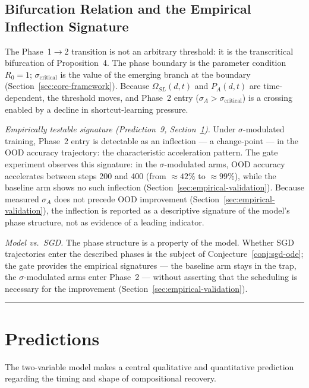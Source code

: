 \documentclass{article}
\theoremstyle{definition}
\begin{document}
\subsection{Bifurcation Relation and the Empirical Inflection Signature}\label{sec:bifurcation}

The Phase~1$\to$2 transition is not an arbitrary threshold: it is the
transcritical bifurcation of Proposition~4. The phase boundary is the
parameter condition $R_0 = 1$; $\sigma_{\text{critical}}$ is the value
of the emerging branch at the boundary (Section~\ref{sec:core-framework}).
Because $\Omega_{SL}(d,t)$ and $P_A(d,t)$ are time-dependent, the
threshold moves, and Phase~2 entry ($\sigma_A > \sigma_{\text{critical}}$)
is a crossing enabled by a decline in shortcut-learning pressure.

\noindent\emph{Empirically testable signature (Prediction~9,
Section~\ref{sec:predictions}).} Under $\sigma$-modulated training,
Phase~2 entry is detectable as an inflection --- a change-point --- in
the OOD accuracy trajectory: the characteristic acceleration pattern.
The gate experiment observes this signature: in the $\sigma$-modulated
arms, OOD accuracy accelerates between steps 200 and 400 (from
$\approx 42\%$ to $\approx 99\%$), while the baseline arm shows no such
inflection (Section~\ref{sec:empirical-validation}). Because measured
$\sigma_A$ does not precede OOD improvement
(Section~\ref{sec:empirical-validation}), the inflection is reported as
a descriptive signature of the model's phase structure, not as evidence
of a leading indicator.

\noindent\emph{Model vs.\ SGD.} The phase structure is a property of
the model. Whether SGD trajectories enter the described phases is the
subject of Conjecture~\ref{conj:sgd-ode}; the gate provides the
empirical signatures --- the baseline arm stays in the trap, the
$\sigma$-modulated arms enter Phase~2 --- without asserting that the
scheduling is necessary for the improvement
(Section~\ref{sec:empirical-validation}).

\noindent\rule{\linewidth}{0.4pt}

\section{Predictions}\label{sec:predictions}

The two-variable model makes a central qualitative and quantitative prediction regarding the timing and shape of compositional recovery.
\end{document}
